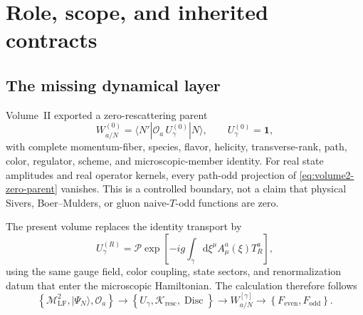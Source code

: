 \documentclass[11pt]{article}
\newcommand{\dd}{\mathrm{d}}
\newcommand{\Disc}{\operatorname{Disc}}
\newcommand{\LF}{\mathrm{LF}}
\newcommand{\cO}{\mathcal O}
\newcommand{\cM}{\mathcal M}
\newcommand{\cK}{\mathcal K}
\newcommand{\bbone}{\bm 1}
\newcommand{\Tord}{\mathcal P}
\newcommand{\odd}{\mathrm{odd}}
\newcommand{\even}{\mathrm{even}}
\begin{document}
\begin{abstract}
A properly defined TMD or GTMD additionally requires rapidity regulation,
soft subtraction, ultraviolet renormalization, and matching
\cite{EchevarriaGTMD2016,EchevarriaSoft2016}.  We formulate two admissible
microscopic routes: a boundary-only calculation in which rapidity logarithms
and the Collins--Soper kernel are left to Volume~V, and a joint soft-sector
calculation in which both the boundary and kernel are generated and matched
from the same microscopic theory.  Mixing the two routes is prohibited.
Higher eikonal orders are organized by Dyson and Magnus expansions with
independent Wilson-order convergence.  A process registry carries the
factorization theorem, link map, hard color weights, and Glauber status, and
fails closed in channels where separate-hadron TMD factorization is not
established or is known to fail \cite{CollinsQiu2007,RogersMulders2010}.
The volume concludes with formal propositions, analytic benchmarks, software
interfaces, property-based tests, and acceptance criteria for exporting a
dynamical link-resolved nucleon parent to Volumes~IV and~V.
\end{abstract}

\tableofcontents

\section{Role, scope, and inherited contracts}
\label{sec:role}

\subsection{The missing dynamical layer}

Volume~II exported a zero-rescattering parent
\begin{equation}
 W_{a/N}^{(0)}
 =\langle N'|\cO_a\,U_{\gamma}^{(0)}|N\rangle,
 \qquad U_{\gamma}^{(0)}=\bbone,
\label{eq:volume2-zero-parent}
\end{equation}
with complete momentum-fiber, species, flavor, helicity, transverse-rank,
path, color, regulator, scheme, and microscopic-member identity.  For real
state amplitudes and real operator kernels, every path-odd projection of
\cref{eq:volume2-zero-parent} vanishes.  This is a controlled boundary, not a
claim that physical Sivers, Boer--Mulders, or gluon naive-\(T\)-odd functions
are zero.

The present volume replaces the identity transport by
\begin{equation}
 U_\gamma^{(R)}
 =\Tord\exp\!\left[-ig\int_\gamma \dd\xi^\mu
 A_\mu^a(\xi)T_R^a\right],
\label{eq:wilson-transport-intro}
\end{equation}
using the same gauge field, color coupling, state sectors, and
renormalization datum that enter the microscopic Hamiltonian.  The
calculation therefore follows
\begin{equation}
 \left\{\cM_{\LF}^2,|\Psi_N\rangle,\cO_a\right\}
 \longrightarrow
 \left\{U_\gamma,\cK_{\mathrm{resc}},\Disc\right\}
 \longrightarrow
 W_{a/N}^{[\gamma]}
 \longrightarrow
 \left\{F_{\even},F_{\odd}\right\}.
\label{eq:volume3-chain}
\end{equation}
\end{document}
